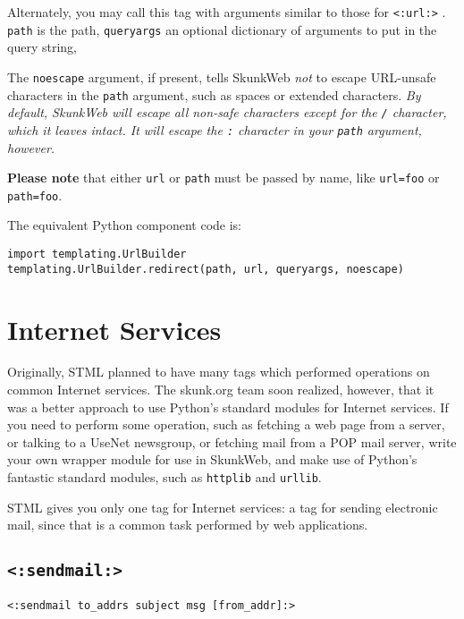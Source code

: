 \documentclass{manual}
\begin{document}
Alternately, you may call this tag with arguments
similar to those for 
\texttt{<:url:>} . 
\texttt{path} is the path, \texttt{queryargs} an optional
dictionary of arguments to put in the query string,


The \texttt{noescape} argument, if present,
tells SkunkWeb \emph{not} to escape URL-unsafe characters in the \texttt{path}
argument, such as spaces or extended characters. \emph{By default,
SkunkWeb will escape all non-safe characters except for the \texttt{/}
character, which it leaves intact. It will escape the \texttt{:}
character in your \texttt{path} argument, however.}


\textbf{Please note} that either \texttt{url} or \texttt{path}
must be passed by name, like \texttt{url=foo} or 
\texttt{path=foo}.



The equivalent Python component code is: 
\begin{verbatim}
import templating.UrlBuilder
templating.UrlBuilder.redirect(path, url, queryargs, noescape)
\end{verbatim}




\chapter{Internet Services}
\label{stmlrefnet}
Originally, STML planned to have many tags
which performed operations on common Internet services.
The skunk.org team soon realized, however, that
it was a better approach to use Python's standard
modules for Internet services. If you need to perform
some operation, such as fetching a web page from a server,
or talking to a UseNet newsgroup, or fetching mail
from a POP mail server, write your own wrapper module
for use in SkunkWeb, and make use of Python's fantastic
standard modules, such as \texttt{httplib} and
\texttt{urllib}.

STML gives you only one tag for Internet services:
a tag for sending electronic mail, since that is
a common task performed by web applications.

\section{\texttt{<:sendmail:>}}
\label{tagsendmail}
\texttt{<:sendmail to_addrs subject msg [from_addr]:>}
\end{document}

